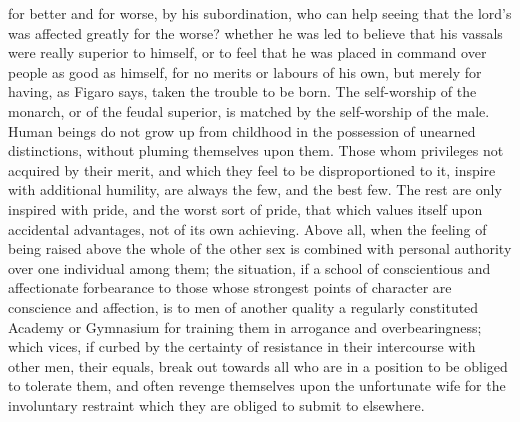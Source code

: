 \documentclass[12pt]{report}
\begin{document}
for better and for worse, by his subordination, who can help seeing that the lord's was affected greatly for the worse? whether he was led to believe that his vassals were really superior to himself, or to feel that he was placed in command over people as good as himself, for no merits or labours of his own, but merely for having, as Figaro says, taken the trouble to be born. The self-worship of the monarch, or of the feudal superior, is matched by the self-worship of the male. Human beings do not grow up from childhood in the possession of unearned distinctions, without pluming themselves upon them. Those whom privileges not acquired by their merit, and which they feel to be disproportioned to it, inspire with additional humility, are always the few, and the best few. The rest are only inspired with pride, and the worst sort of pride, that which values itself upon accidental advantages, not of its own achieving. Above all, when the feeling of being raised above the whole of the other sex is combined with personal authority over one individual among them; the situation, if a school of conscientious and affectionate forbearance to those whose strongest points of character are conscience and affection, is to men of another quality a regularly constituted Academy or Gymnasium for training them in arrogance and overbearingness; which vices, if curbed by the certainty of resistance in their intercourse with other men, their equals, break out towards all who are in a position to be obliged to tolerate them, and often revenge themselves upon the unfortunate wife for the involuntary restraint which they are obliged to submit to elsewhere.
\end{document}
